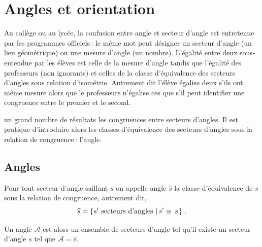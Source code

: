     
    \section{Angles et orientation}

Au collège ou au lycée, la confusion entre angle et secteur d'angle est entretenue par les programmes officiels\,: le même mot  peut désigner un secteur d'angle (un lieu géométrique) ou une mesure d'angle (un nombre). L'égalité entre deux  sous-entendue par les élèves est celle de la mesure d'angle tandis que l'égalité des professeurs (non ignorants) et celles de la classe d'équivalence des secteurs d'angles sous relation d'isométrie. Autrement dit l'élève égalise deux  s'ils ont même mesure alors que le professeurs n'égalise ces  que s'il peut identifier une congruence entre le premier et le second.

 un grand nombre de résultats  les congruences entre secteurs d'angles. Il est pratique d'introduire alors les classes d'équivalence des secteurs d'angles sous la relation de congruence\,: l'angle.

        \subsection{Angles}

\begin{defi}[Angles]\label{defi-angle}
    Pour tout secteur d'angle saillant $s$ on appelle angle $\widehat{s}$ la classe d'équivalence de $s$ sous la relation de congruence, autrement dit,
    \begin{equation*}
        \widehat{s} = \left\{s' \text{ secteurs d'angles}\,\left|\,s' \equiv \, s\right.\right\}\,.
    \end{equation*}
    
    Un angle $\mathcal{A}$ est alors un ensemble de secteurs d'angle tel qu'il existe un secteur d'angle $s$ tel que $\mathcal{A}=\widehat{s}$. 
\end{defi}

